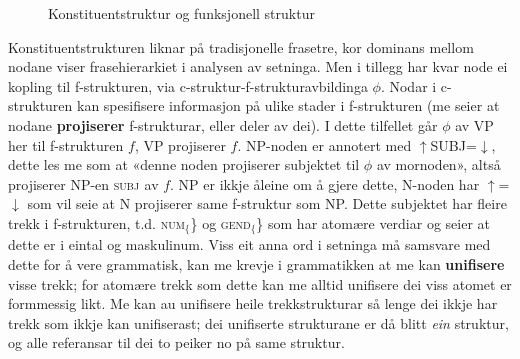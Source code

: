 \documentclass[11pt,a4paper,oneside,draft]{book}
\newcommand{\F}[2]{\textsc{#1}\ensuremath{_{#2}}}
\newcommand{\SUBJ}{\F{subj}{}}
\newcommand{\proj}[2]{\begin{tabular}{c}\footnotesize{#1}\\\normalsize{#2}\end{tabular}}
\newcommand{\ua}{\ensuremath{\uparrow}}
\newcommand{\da}{\ensuremath{\downarrow}}
\begin{document}
 \begin{figure}[htp]
    \centering

    \caption{Konstituentstruktur og funksjonell struktur}
   \label{fig:f-og-c-struktur}
 \end{figure}

 Konstituentstrukturen liknar på tradisjonelle frasetre, kor dominans
 mellom nodane viser frasehierarkiet i analysen av setninga. Men i
 tillegg har kvar node ei kopling til f-strukturen, via
 c-struktur-f-strukturavbildinga $\phi{}$. Nodar i c-strukturen kan
 spesifisere informasjon på ulike stader i f-strukturen (me seier at
 nodane \textbf{projiserer} f-strukturar, eller deler av dei).  I dette
 tilfellet går $\phi$ av VP her til f-strukturen $f$, VP projiserer
 $f$. NP-noden er annotert med \ua{}SUBJ=\da{}, dette les me som at
 «denne noden projiserer subjektet til $\phi$ av mornoden», altså
 projiserer NP-en \SUBJ{} av $f$. NP er ikkje åleine om å gjere dette,
 N-noden har \ua{}=\da{} som vil seie at N projiserer same f-struktur
 som NP. Dette subjektet har fleire trekk i f-strukturen,
 t.d. \F{num}\{\} og \F{gend}\{\} som har atomære verdiar og seier at
 dette er i eintal og maskulinum. Viss eit anna ord i setninga må
 samsvare med dette for å vere grammatisk, kan me krevje i
 grammatikken at me kan \textbf{unifisere} visse trekk; for atomære trekk som
 dette kan me alltid unifisere dei viss atomet er formmessig likt. Me kan au
 unifisere heile trekkstrukturar så lenge dei ikkje har trekk som
 ikkje kan unifiserast; dei unifiserte strukturane er då blitt \emph{ein}
 struktur, og alle referansar til dei to peiker no på same struktur. 
\end{document}
